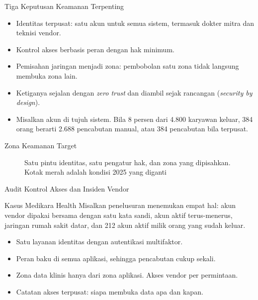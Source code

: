 \documentclass[aspectratio=169, table, 12pt]{beamer}
\begin{document}
\begin{frame}{{\Large Tiga Keputusan Keamanan Terpenting}}
  \small
  \vspace{6pt}
  \begin{itemize}
    \item Identitas terpusat: satu akun untuk semua sistem, termasuk dokter mitra dan teknisi vendor.
    \item Kontrol akses berbasis peran dengan hak minimum.
    \item Pemisahan jaringan menjadi zona: pembobolan satu zona tidak langsung membuka zona lain.
    \item Ketiganya sejalan dengan \textit{zero trust} dan diambil sejak rancangan (\textit{security by
          design}).
    \item Misalkan akun di tujuh sistem. Bila 8 persen dari 4.800 karyawan keluar, 384 orang berarti
          2.688 pencabutan manual, atau 384 pencabutan bila terpusat.
  \end{itemize}
\end{frame}

\begin{frame}{{\Large Zona Keamanan Target}}
  \centering
  \begin{figure}
    \resizebox{0.80\textwidth}{!}{}
    \caption{Satu pintu identitas, satu pengatur hak, dan zona yang dipisahkan. Kotak merah adalah
             kondisi 2025 yang diganti}
  \end{figure}
\end{frame}

\begin{frame}{{\Large Audit Kontrol Akses dan Insiden Vendor}}
  \begin{block}{Kasus Medikara Health}
    \small
    Misalkan penelusuran menemukan empat hal: akun vendor dipakai bersama dengan satu kata sandi, akun
    aktif terus-menerus, jaringan rumah sakit datar, dan 212 akun aktif milik orang yang sudah keluar.
    \vspace{2pt}
    \begin{itemize}
      \item Satu layanan identitas dengan autentikasi multifaktor.
      \item Peran baku di semua aplikasi, sehingga pencabutan cukup sekali.
      \item Zona data klinis hanya dari zona aplikasi. Akses vendor per permintaan.
      \item Catatan akses terpusat: siapa membuka data apa dan kapan.
    \end{itemize}
  \end{block}
\end{frame}
\end{document}
